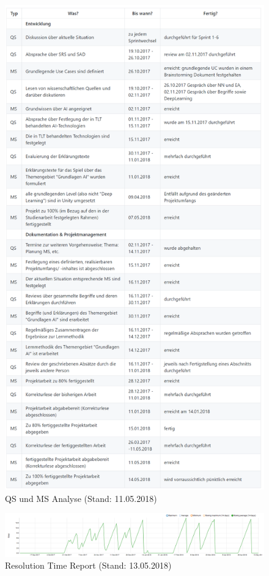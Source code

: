 \begin{figure}[ht]
\centering
\includegraphics[scale=0.65]{bilder/QSMSS6.PNG}
\caption{QS und MS Analyse (Stand: 11.05.2018)}
\label{QSMSAnalyseBild}
\end{figure}

\begin{figure}
\centering
\includegraphics[scale=0.45]{bilder/ResoltutionTime.PNG}
\caption{Resolution Time Report (Stand: 13.05.2018)}
\label{RTimeReport}
\end{figure}

